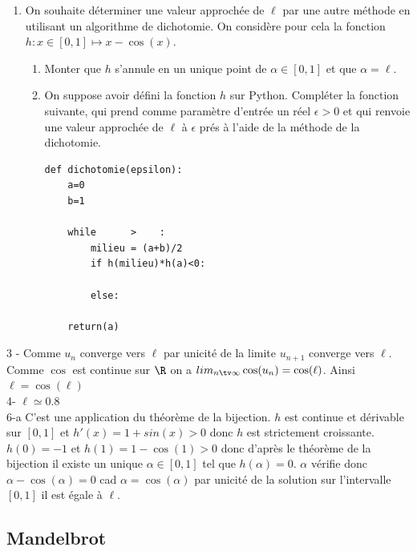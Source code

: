\begin{probleme}[Informatique]
\begin{enumerate}
\begin{enumerate}
\end{enumerate}
\item On souhaite déterminer une valeur approchée de $\ell $ par une autre méthode en utilisant un algorithme de dichotomie. On considère pour cela la fonction $h : x \in [0,1] \mapsto x- \cos(x).$
\begin{enumerate}
\item Monter que $h$ s'annule en un unique point de $\alpha \in [0,1]$ et que $\alpha =\ell$. 
\item On suppose avoir défini la fonction $h$ sur Python. Compléter la fonction suivante, qui prend comme paramètre d'entrée un réel $\epsilon>0$ et qui renvoie une valeur approchée de $\ell$ à $\epsilon $ prés à l'aide de la méthode de la dichotomie. 
\begin{lstlisting}
def dichotomie(epsilon):
    a=0
    b=1

    while      >    :
        milieu = (a+b)/2
        if h(milieu)*h(a)<0:
            
        else:
            
    return(a)
\end{lstlisting}


\end{enumerate}
\end{enumerate}




\end{probleme}

\begin{correction}
3 - Comme $u_n$ converge vers $\ell$ par unicité de la limite $u_{n+1}$ converge vers $\ell$. Comme $\cos$ est continue sur $\R$ on a 
$lim_{n\tv\infty} \cos(u_n) = \cos(\ell)$. Ainsi $\ell =\cos(\ell)$\\
4- $\ell \simeq 0.8$\\
6-a C'est une application du théorème de la bijection. 
$h$ est continue et dérivable sur $[0,1]$ et $h'(x) = 1+sin(x) >0$ donc $h$ est strictement croissante. $h(0)=-1$ et $h(1)= 1-\cos(1)>0 $ donc d'après le théorème de la bijection il existe un unique $\alpha \in [0,1]$ tel que $h(\alpha) =0$. 
$\alpha$ vérifie donc $\alpha-\cos(\alpha)=0$ cad $\alpha =\cos(\alpha)$ par unicité de la solution sur l'intervalle $[0,1]$ il est égale à $\ell$. 

\end{correction}



\subsection{Mandelbrot}

